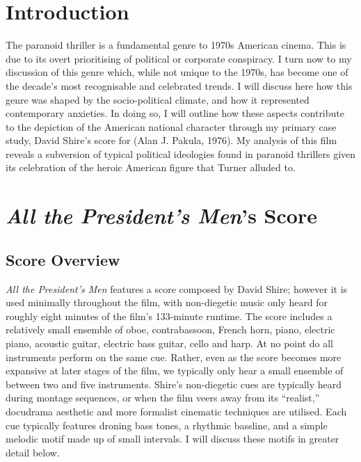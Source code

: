 

\section{Introduction}

The paranoid thriller is a fundamental genre to 1970s American cinema.
This is due to its overt prioritising of political or corporate conspiracy.
I turn now to my discussion of this genre which, while not unique to the 1970s, has become one of the decade's most recognisable and celebrated trends.
I will discuss here how this genre was shaped by the socio-political climate, and how it represented contemporary anxieties.
In doing so, I will outline how these aspects contribute to the depiction of the American national character through my primary case study, David Shire's score for  (Alan J. Pakula, 1976). 
My analysis of this film reveals a subversion of typical political ideologies found in paranoid thrillers given its celebration of the heroic American figure that Turner alluded to. 


\section{\textit{All the President's Men}'s Score}

\subsection{Score Overview}

\textit{All the President’s Men} features a score composed by David Shire; however it is used minimally throughout the film, with non-diegetic music only heard for roughly eight minutes of the film's 133-minute runtime.
The score includes a relatively small ensemble of oboe, contrabassoon, French horn, piano, electric piano, acoustic guitar, electric bass guitar, cello and harp.
At no point do all instruments perform on the same cue.
Rather, even as the score becomes more expansive at later stages of the film, we typically only hear a small ensemble of between two and five instruments.
Shire's non-diegetic cues are typically heard during montage sequences, or when the film veers away from its ``realist,” docudrama aesthetic and more formalist cinematic techniques are utilised.
Each cue typically features droning bass tones, a rhythmic bassline, and a simple melodic motif made up of small intervals. I will discuss these motifs in greater detail below.

